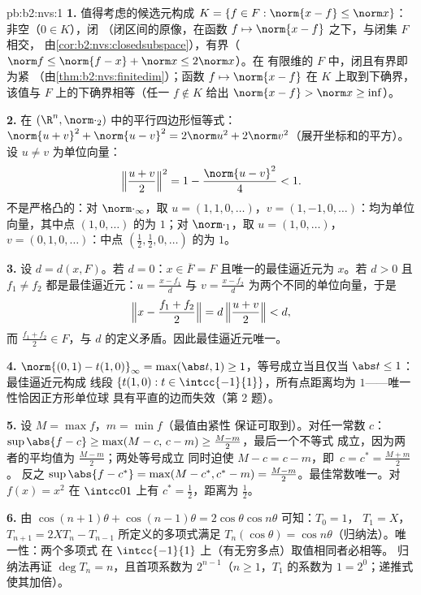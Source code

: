 \begin{solution}{pb:b2:nvs:1}
\textbf{1.} 值得考虑的候选元构成 $K = \{f \in F
: \norm{x - f} \leq \norm x\}$：非空（$0 \in K$），闭
（闭区间的原像，在函数 $f \mapsto
\norm{x - f}$ 之下，与闭集 $F$ 相交，
由\cref{cor:b2:nvs:closedsubspace}），有界（$\norm f \leq
\norm{f - x} + \norm x \leq 2\norm x$）。在
有限维的 $F$ 中，闭且有界即为紧
（由\cref{thm:b2:nvs:finitedim}）；函数 $f
\mapsto \norm{x - f}$ 在 $K$ 上取到下确界，该值与
$F$ 上的下确界相等（任一 $f \notin K$ 给出 $\norm{x -
f} > \norm x \geq \inf$）。

\textbf{2.} 在 $(\R^n,
\norm\cdot_2)$ 中的平行四边形恒等式：$\norm{u + v}^2 + \norm{u - v}^2 = 2\norm u^2 +
2\norm v^2$（展开坐标和的平方）。
设 $u \neq v$ 为单位向量：
\[
\Bigl\Vert\frac{u+v}2\Bigr\Vert^2 = 1 - \frac{\norm{u -
v}^2}{4} < 1 .
\]
不是严格凸的：对 $\norm\cdot_\infty$，取 $u = (1, 1, 0,
\dots)$，$v = (1, -1, 0, \dots)$：均为单位向量，其中点
$(1, 0, \dots)$ 的为 $1$；对 $\norm\cdot_1$，取 $u = (1,
0, \dots)$，$v = (0, 1, 0, \dots)$：中点 $(\frac12,
\frac12, 0, \dots)$ 的为 $1$。

\textbf{3.} 设 $d = d(x, F)$。若 $d = 0$：$x \in \overline F =
F$ 且唯一的最佳逼近元为 $x$。若 $d > 0$ 且 $f_1 \neq f_2$
都是最佳逼近元：$u = \frac{x - f_1}{d}$ 与 $v = \frac{x -
f_2}{d}$ 为两个不同的单位向量，于是
\[
\Bigl\Vert x - \frac{f_1 + f_2}2\Bigr\Vert
= d\,\Bigl\Vert\frac{u + v}2\Bigr\Vert < d ,
\]
而 $\frac{f_1 + f_2}2 \in F$，与
$d$ 的定义矛盾。因此最佳逼近元唯一。

\textbf{4.} $\norm{(0,1) - t(1,0)}_\infty = \max(\abs t, 1)
\geq 1$，等号成立当且仅当 $\abs t \leq 1$：最佳逼近元构成
线段 $\{t(1, 0) : t \in \intcc{-1}{1}\}$，所有点距离均为
$1$——唯一性恰因正方形单位球
具有平直的边而失效（第 2 题）。

\textbf{5.} 设 $M = \max f$，$m = \min f$（最值由紧性
保证可取到）。对任一常数 $c$：$\sup\abs{f - c} \geq
\max(M - c,\, c - m) \geq \frac{M - m}2$，最后一个不等式
成立，因为两者的平均值为 $\frac{M-m}2$；两处等号成立
同时迫使 $M - c = c - m$，即\ $c = c^* = \frac{M + m}2$。
反之 $\sup\abs{f - c^*} = \max(M - c^*, c^* - m) =
\frac{M - m}2$。最佳常数唯一。对 $f(x) = x^2$ 在
$\intcc01$ 上有 $c^* = \frac12$，距离为 $\frac12$。

\textbf{6.} 由 $\cos(n{+}1)\theta + \cos(n{-}1)\theta =
2\cos\theta\cos n\theta$ 可知：$T_0 = 1$，
$T_1 = X$，$T_{n+1} = 2XT_n - T_{n-1}$ 所定义的多项式满足 $T_n(\cos\theta)
= \cos n\theta$（归纳法）。唯一性：两个多项式
在 $\intcc{-1}{1}$ 上（有无穷多点）取值相同者必相等。
归纳法再证 $\deg T_n = n$，且首项系数为
$2^{n-1}$（$n \geq 1$，$T_1$ 的系数为 $1 = 2^0$；递推式
使其加倍）。


\end{solution}
